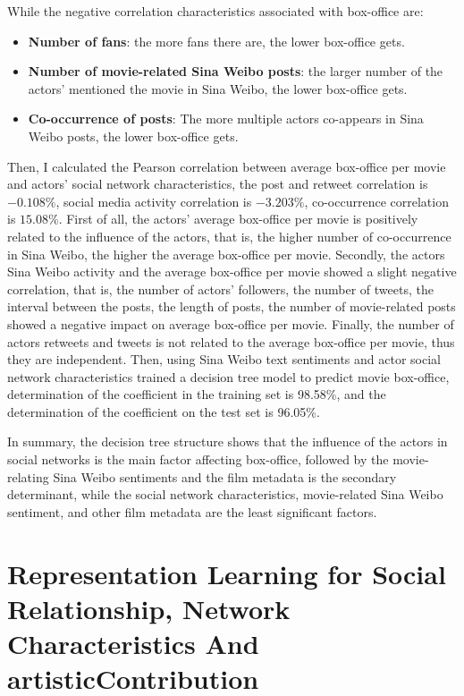 \documentclass[review]{cvpr}
\begin{document}
While the negative correlation characteristics associated with box-office are:
\begin{itemize}
\item {\bf Number of fans}: the more fans there are, the lower box-office gets.
\item {\bf Number of movie-related Sina Weibo posts}: the larger number of the actors' mentioned the movie in Sina Weibo, the lower box-office gets.
\item {\bf Co-occurrence of posts}: The more multiple actors co-appears in Sina Weibo posts, the lower box-office gets.
\end{itemize}

\par Then, I calculated the Pearson correlation between average box-office per movie and actors' social network characteristics, the post and retweet correlation is $-0.108\%$, social media activity correlation is $-3.203\%$, co-occurrence correlation is $15.08\%$.
First of all, the actors' average box-office per movie is positively related to the influence of the actors, that is, the higher number of co-occurrence in Sina Weibo, the higher the average box-office per movie.
Secondly, the actors Sina Weibo activity and the average box-office per movie showed a slight negative correlation, that is,
the number of actors' followers, the number of tweets, the interval between the posts, the length of posts, the number of movie-related posts showed a negative impact on average box-office per movie.
Finally, the number of actors retweets and tweets is not related to the average box-office per movie, thus they are independent.
Then, using Sina Weibo text sentiments and actor social network characteristics trained a decision tree model to predict movie box-office,
determination of the coefficient in the training set is 98.58\%, and the determination of the coefficient on the test set is 96.05\%.

\par In summary, the decision tree structure shows that the influence of the actors in social networks is the main factor affecting box-office,
followed by the movie-relating Sina Weibo sentiments and the film metadata is the secondary determinant,
while the social network characteristics, movie-related Sina Weibo sentiment, and other film metadata are the least significant factors.

\section{Representation Learning for Social Relationship, Network Characteristics And artisticContribution}
\end{document}
